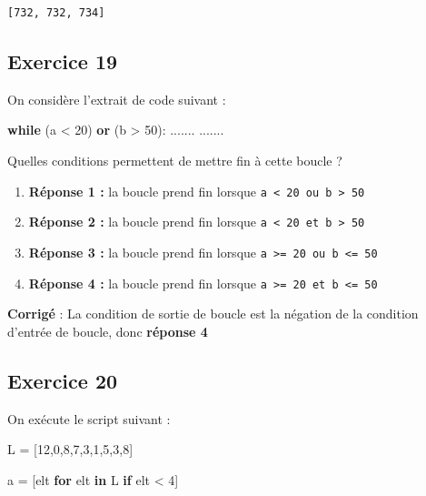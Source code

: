 \documentclass[11pt]{article}
\newenvironment{Shaded}{}{}
\newcommand{\KeywordTok}[1]{\textcolor[rgb]{0.00,0.44,0.13}{\textbf{{#1}}}}
\newcommand{\DecValTok}[1]{\textcolor[rgb]{0.25,0.63,0.44}{{#1}}}
\newcommand{\NormalTok}[1]{{#1}}
\newcommand{\ControlFlowTok}[1]{\textcolor[rgb]{0.00,0.44,0.13}{\textbf{{#1}}}}
\newcommand{\OperatorTok}[1]{\textcolor[rgb]{0.40,0.40,0.40}{{#1}}}
\begin{document}
    \begin{Verbatim}[commandchars=\\\{\}]
[732, 732, 734]

    \end{Verbatim}

    \hypertarget{exercice-19}{%
\subsection{Exercice 19}\label{exercice-19}}

On considère l'extrait de code suivant :

\begin{Shaded}
\begin{Highlighting}[]
\ControlFlowTok{while}\NormalTok{ (a }\OperatorTok{<} \DecValTok{20}\NormalTok{) }\KeywordTok{or}\NormalTok{ (b }\OperatorTok{>} \DecValTok{50}\NormalTok{):}
\NormalTok{    .......}
\NormalTok{    .......}
\end{Highlighting}
\end{Shaded}

Quelles conditions permettent de mettre fin à cette boucle ?

\begin{enumerate}
\def\labelenumi{\arabic{enumi}.}
\item
  \textbf{Réponse 1 :} la boucle prend fin lorsque
  \texttt{a\ \textless{}\ 20\ ou\ b\ \textgreater{}\ 50}
\item
  \textbf{Réponse 2 :} la boucle prend fin lorsque
  \texttt{a\ \textless{}\ 20\ et\ b\ \textgreater{}\ 50}
\item
  \textbf{Réponse 3 :} la boucle prend fin lorsque
  \texttt{a\ \textgreater{}=\ 20\ ou\ b\ \textless{}=\ 50}
\item
  \textbf{Réponse 4 :} la boucle prend fin lorsque
  \texttt{a\ \textgreater{}=\ 20\ et\ b\ \textless{}=\ 50}
\end{enumerate}

    \textbf{Corrigé} : La condition de sortie de boucle est la négation de
la condition d'entrée de boucle, donc \textbf{réponse 4}

    \hypertarget{exercice-20}{%
\subsection{Exercice 20}\label{exercice-20}}

On exécute le script suivant :

\begin{Shaded}
\begin{Highlighting}[]
\NormalTok{L }\OperatorTok{=}\NormalTok{ [}\DecValTok{12}\NormalTok{,}\DecValTok{0}\NormalTok{,}\DecValTok{8}\NormalTok{,}\DecValTok{7}\NormalTok{,}\DecValTok{3}\NormalTok{,}\DecValTok{1}\NormalTok{,}\DecValTok{5}\NormalTok{,}\DecValTok{3}\NormalTok{,}\DecValTok{8}\NormalTok{]}

\NormalTok{a }\OperatorTok{=}\NormalTok{ [elt }\ControlFlowTok{for}\NormalTok{ elt }\KeywordTok{in}\NormalTok{ L }\ControlFlowTok{if}\NormalTok{ elt }\OperatorTok{<} \DecValTok{4}\NormalTok{]}
\end{Highlighting}
\end{Shaded}
\end{document}
